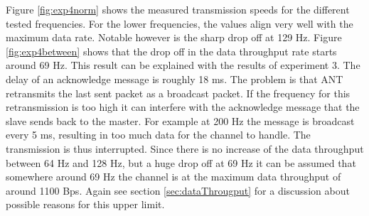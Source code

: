 \begin{description}
	Figure \ref{fig:exp4norm} shows the measured transmission speeds for the different tested frequencies. For the lower frequencies, the values align very well with the maximum data rate. Notable however is the sharp drop off at 129 Hz. Figure \ref{fig:exp4between} shows
	that the drop off in the data throughput rate starts around 69 Hz. This result can be explained with the results of experiment 3. The delay of an acknowledge message is roughly 18 ms. The problem is that ANT retransmits the last sent packet as a broadcast packet. If the frequency for this retransmission is too high it can interfere with the acknowledge message that the slave sends back to the master. For example at 200 Hz the message is broadcast every 5 ms, resulting in too much data for the channel to handle. The transmission is thus interrupted. Since there is no increase of the data throughput between 64 Hz and 128 Hz, but a huge drop off at 69 Hz it can be assumed that somewhere around 69 Hz the channel is at the maximum data throughput of around 1100 Bps. Again see section \ref{sec:dataThrougput} for a discussion about possible reasons for this upper limit. 
	
\end{description}
\newpage

